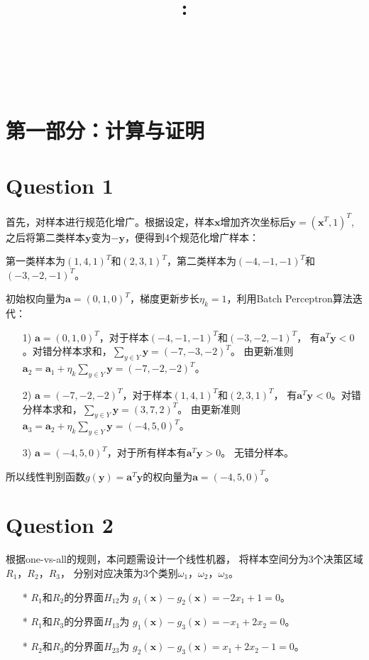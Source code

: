 \documentclass{article}
\title{
    \vspace{2in}
    \textmd{\textbf{\courseName}:\homeworkTitle}\\
    \vspace{0.1in}
    \large{\studentId}\\
    \large{\studentName}\\
    \vspace{3in}
}
\newcommand{\question}[1]{\section*{Question #1}}
\begin{document}
\maketitle
\date{}
\pagebreak

\section*{第一部分：计算与证明}

\question{1}
首先，对样本进行规范化增广。根据设定，样本$\pmb{x}$增加齐次坐标后$\pmb{y} = (\pmb{x}^T, 1)^T$,
之后将第二类样本$\pmb{y}$变为$-\pmb{y}$，便得到4个规范化增广样本：

第一类样本为$(1, 4, 1)^T$和$(2, 3, 1)^T$，第二类样本为$(-4, -1, -1)^T$和$(-3, -2, -1)^T$。

初始权向量为$\pmb{a} = (0, 1, 0)^T$，梯度更新步长$\eta_k = 1$，利用Batch Perceptron算法迭代：
\begin{itemize}
	\item [1)] 
	$\pmb{a} = (0, 1, 0)^T$，对于样本$(-4, -1, -1)^T$和$(-3, -2, -1)^T$，
	有$\pmb{a}^T\pmb{y} < 0$。对错分样本求和，$\sum\limits_{y \in Y}\boldsymbol{y} = (-7, -3, -2)^T$。
	由更新准则$\pmb{a}_2 = \pmb{a}_1 + \eta_k \sum\limits_{y \in Y}\pmb{y} = (-7, -2, -2)^T$。
	\item [2)]
	$\pmb{a} = (-7, -2, -2)^T$，对于样本$(1, 4, 1)^T$和$(2, 3, 1)^T$，
	有$\pmb{a}^T\pmb{y} < 0$。对错分样本求和，$\sum\limits_{y \in Y}\boldsymbol{y} = (3, 7, 2)^T$。
	由更新准则$\pmb{a}_3 = \pmb{a}_2 + \eta_k \sum\limits_{y \in Y}\pmb{y} = (-4, 5, 0)^T$。
	\item [3)]
	$\pmb{a} = (-4, 5, 0)^T$，对于所有样本有$\pmb{a}^T\pmb{y} > 0$。
	无错分样本。
\end{itemize}

所以线性判别函数$g(\pmb{y}) = \pmb{a}^T\pmb{y}$的权向量为$\pmb{a} = (-4, 5, 0)^T$。

\question{2}
根据one-vs-all的规则，本问题需设计一个线性机器，
将样本空间分为3个决策区域$R_1$，$R_2$，$R_3$，
分别对应决策为3个类别$\omega_1$，$\omega_2$，$\omega_3$。
\begin{itemize}
	\item[*] $R_1$和$R_2$的分界面$H_{12}$为
	$g_1(\pmb{x}) - g_2(\pmb{x}) = -2x_1 + 1 = 0$。
	\item[*] $R_1$和$R_3$的分界面$H_{13}$为
	$g_1(\pmb{x}) - g_3(\pmb{x}) = -x_1 + 2x_2 = 0$。
	\item[*] $R_2$和$R_3$的分界面$H_{23}$为
	$g_2(\pmb{x}) - g_3(\pmb{x}) = x_1 + 2x_2 -1 = 0$。
\end{itemize}
\end{document}

